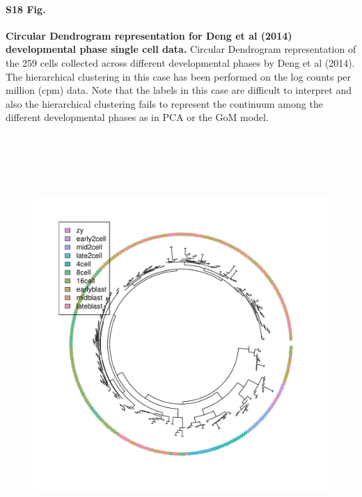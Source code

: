 \documentclass[10pt,letterpaper]{article}
\begin{document}
\paragraph*{S18 Fig.}

\label{figS18}
{\bf Circular Dendrogram representation for Deng et al (2014) developmental phase single cell data.} Circular Dendrogram representation of the 259 cells collected across different
developmental phases by Deng et al (2014). The hierarchical clustering in
this case has been performed on the log counts per million (cpm) data.
Note that the labels in this case are difficult to interpret and also the hierarchical
clustering fails to represent the continuum among the different developmental
phases as in PCA or the GoM model.
\begin{figure}[ht]
\centering
\includegraphics[height=6.3in, width=6in]{../../plots/dendextend_deng_circle.pdf}
\end{figure}
\end{document}
